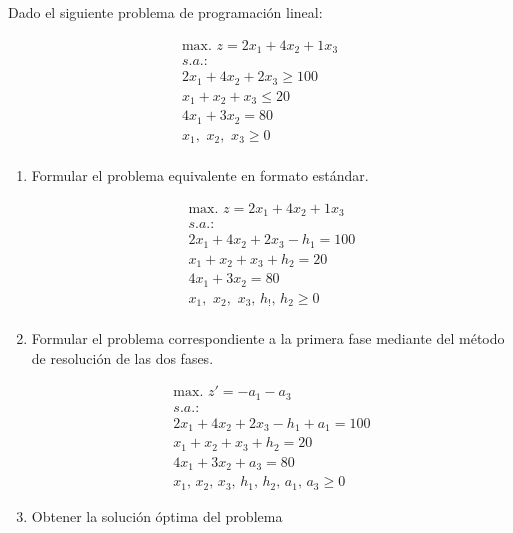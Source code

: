 Dado el siguiente problema de programación lineal:


\begin{equation}
\begin{split}
\mbox{max. } z = 2x_1 + 4x_2 + 1x_3\\
s.a.:\\
2x_1 + 4x_2 + 2x_3 \geq 100\\
 x_1 +  x_2 +  x_3 \leq 20\\
4x_1 + 3x_2         = 80\\
x_1,\,\,x_2,\,\,x_3\geq 0\\
\end{split}
\end{equation}

\begin{enumerate}
    \item Formular el problema equivalente en formato estándar.

\begin{equation}
\begin{split}
\mbox{max. } z = 2x_1 + 4x_2 + 1x_3\\
s.a.:\\
2x_1 + 4x_2 + 2x_3 -h_1 = 100\\
 x_1 +  x_2 +  x_3 + h_2 = 20\\
4x_1 + 3x_2         = 80\\
x_1,\,\,x_2,\,\,x_3,\,h_!,\,h_2\geq 0\\
\end{split}
\end{equation}




    \item Formular el problema correspondiente a la primera fase mediante del método de resolución de las dos fases.

\begin{equation}
\begin{split}
\mbox{max. } z' = -a_1-a_3\\
s.a.:\\
2x_1+4x_2+2x_3-h_1+a_1 = 100\\
x_1+x_2+x_3+h_2 = 20\\
4x_1+3x_2+a_3 = 80\\
x_1,\,x_2,\,x_3,\,h_1,\,h_2,\,a_1,\,a_3\geq 0\end{split}
\end{equation}

\item Obtener la solución óptima del problema


\end{enumerate}
